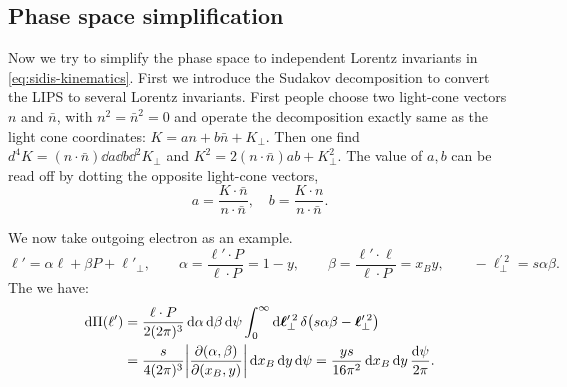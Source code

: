 \documentclass[a4paper,11pt]{article}
\begin{document}
\subsection{Phase space simplification}

Now we try to simplify the phase space to independent Lorentz invariants in \eqref{eq:sidis-kinematics}.
First we introduce the Sudakov decomposition to convert the LIPS to several Lorentz invariants.
First people choose two light-cone vectors $n$ and $\bar n$, with $n^2=\bar n^2=0$ and operate the decomposition exactly same as the light cone coordinates: $K = a n + b \bar n + K_\perp$.
Then one find $d^4K = (n\cdot \bar n) \dd a \dd b \dd^2 K_\perp$ and $K^2 = 2(n\cdot \bar n) ab + K_\perp^2$.
The value of $a,b$ can be read off by dotting the opposite light-cone vectors, $$
a = \frac{K \cdot \bar n}{n \cdot \bar n}, \quad b = \frac{K \cdot n}{n \cdot \bar n}.
$$

We now take outgoing electron as an example.
\begin{equation}
    \ell'=\alpha\ell+\beta P+\ell'_\perp,\qquad
    \alpha=\frac{\ell'\cdot P}{\ell\cdot P}=1-y,\qquad \beta=\frac{\ell'\cdot \ell}{\ell\cdot P}=x_By,\qquad
    -\ell_\perp^{\prime\,2}=s\alpha\beta .
    \label{eq:sidis-lepton-sudakov}
\end{equation}
The we have:
\begin{equation}
    \begin{aligned}
        \dd\Pi(\ell')
        &=\frac{\ell\cdot P}{2(2\pi)^3}\,\dd\alpha\,\dd\beta\,\dd\psi
          \int_0^\infty\dd\bm\ell_\perp^{\prime\,2}\,
          \delta\bigl(s\alpha\beta-\bm\ell_\perp^{\prime\,2}\bigr)\\
        &=\frac{s}{4(2\pi)^3}
          \abs{\frac{\partial(\alpha,\beta)}{\partial(x_B,y)}}\,
          \dd x_B\,\dd y\,\dd\psi
          =\frac{ys}{16\pi^2}\,\dd x_B\,\dd y\,\frac{\dd\psi}{2\pi}.
    \end{aligned}
    \label{eq:sidis-lepton-phase-space}
\end{equation}
\end{document}
